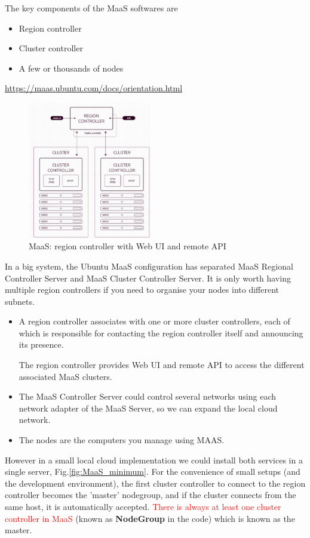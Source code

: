 The key components of the MaaS softwares are
\begin{itemize}
  \item Region controller
  \item Cluster controller
  \item A few or thousands of nodes
\end{itemize}
\url{https://maas.ubuntu.com/docs/orientation.html}

\begin{figure}[hbt]
  \centerline{\includegraphics[height=6cm,
    angle=0]{./images/MaaS_region_controller_cluster_controller.eps}}
\caption{MaaS: region controller with Web UI and remote API}
\label{fig:MaaS_region_controller_cluster_controller}
\end{figure}

In a big system, the Ubuntu MaaS configuration has separated MaaS Regional
Controller Server and MaaS Cluster Controller Server. It is only worth having
multiple region controllers if you need to organise your nodes into different
subnets. 
\begin{itemize}
  \item  
  A region controller associates with one or more
cluster controllers, each of which is responsible for contacting the region
controller itself and announcing its presence.

The region controller provides Web UI and remote API to access the different
associated MaaS clusters.

 \item The MaaS Controller Server could control
several networks using each network adapter of the MaaS Server, so we can expand
the local cloud network.

  \item The nodes are the computers you manage using MAAS. 
\end{itemize}

However in a small local cloud implementation we could install both services in
a single server, Fig.\ref{fig:MaaS_minimum}. For the convenience of small setups
(and the development environment), the first cluster controller to connect to
the region controller becomes the 'master' nodegroup, and if the cluster
connects from the same host, it is automatically accepted. \textcolor{red}{There
is always at least one cluster controller in MaaS} (known as {\bf NodeGroup} in
the code) which is known as the master.
 

